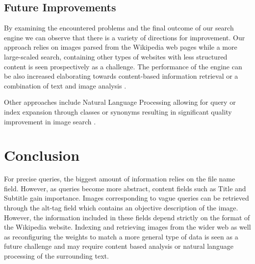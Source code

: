 \documentclass[a4paper]{article}
\begin{document}
\subsection{Future Improvements}
By examining the encountered problems and the final outcome of our search engine we can observe that there is a variety of directions for improvement. Our approach relies on images parsed from the Wikipedia web pages while a more large-scaled search, containing other types of websites with less structured content is seen prospectively as a challenge. The performance of the engine can be also increased elaborating towards content-based information retrieval \cite{cbmir}  or a combination of text and image analysis \cite{WebSeer}.


Other approaches include Natural Language Processing allowing for query or index expansion through classes or synonyms resulting in significant quality improvement in image search \cite{NLP}.


\section{Conclusion}
For precise queries, the biggest amount of information relies on the file name field. However, as queries become more abstract, content fields such as Title and Subtitle gain importance. Images corresponding to vague queries can be retrieved through the alt-tag field which contains an objective description of the image. However, the information included in these fields depend strictly on the format of the Wikipedia website. Indexing and retrieving images from the wider web as well as reconfiguring the weights to match a more general type of data is seen as a future challenge and may require content based analysis or natural language processing of the surrounding text.
\end{document}
